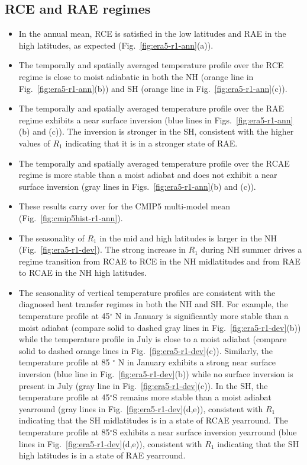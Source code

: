 \documentclass{ametsocV5}
\begin{document}
\subsection{RCE and RAE regimes}
\begin{itemize}
  \item In the annual mean, RCE is satisfied in the low latitudes and RAE in the high latitudes, as expected (Fig.~\ref{fig:era5-r1-ann}(a)).
  \item The temporally and spatially averaged temperature profile over the RCE regime is close to moist adiabatic in both the NH (orange line in Fig.~\ref{fig:era5-r1-ann}(b)) and SH (orange line in Fig.~\ref{fig:era5-r1-ann}(c)).
  \item The temporally and spatially averaged temperature profile over the RAE regime exhibits a near surface inversion (blue lines in Figs.~\ref{fig:era5-r1-ann}(b) and (c)). The inversion is stronger in the SH, consistent with the higher values of $R_{1}$ indicating that it is in a stronger state of RAE.
  \item The temporally and spatially averaged temperature profile over the RCAE regime is more stable than a moist adiabat and does not exhibit a near surface inversion (gray lines in Figs.~\ref{fig:era5-r1-ann}(b) and (c)).
  \item These results carry over for the CMIP5 multi-model mean (Fig.~\ref{fig:cmip5hist-r1-ann}).
  \item The seasonality of \(R_{1}\) in the mid and high latitudes is larger in the NH (Fig.~\ref{fig:era5-r1-dev}). The strong increase in \(R_{1}\) during NH summer drives a regime transition from RCAE to RCE in the NH midlatitudes and from RAE to RCAE in the NH high latitudes.
  \item The seasonality of vertical temperature profiles are consistent with the diagnosed heat transfer regimes in both the NH and SH. For example, the temperature profile at 45$^{\circ}$ N in January is significantly more stable than a moist adiabat (compare solid to dashed gray lines in Fig.~\ref{fig:era5-r1-dev}(b)) while the temperature profile in July is close to a moist adiabat (compare solid to dashed orange lines in Fig.~\ref{fig:era5-r1-dev}(c)). Similarly, the temperature profile at 85 $^{\circ}$ N in January exhibits a strong near surface inversion (blue line in Fig.~\ref{fig:era5-r1-dev}(b)) while no surface inversion is present in July (gray line in Fig.~\ref{fig:era5-r1-dev}(c)). In the SH, the temperature profile at 45$^{\circ}$S remains more stable than a moist adiabat yearround (gray lines in Fig.~\ref{fig:era5-r1-dev}(d,e)), consistent with $R_{1}$ indicating that the SH midlatitudes is in a state of RCAE yearround. The temperature profile at 85$^{\circ}$S exhibits a near surface inversion yearround (blue lines in Fig.~\ref{fig:era5-r1-dev}(d,e)), consistent with $R_{1}$ indicating that the SH high latitudes is in a state of RAE yearround.

\end{itemize}
\end{document}
